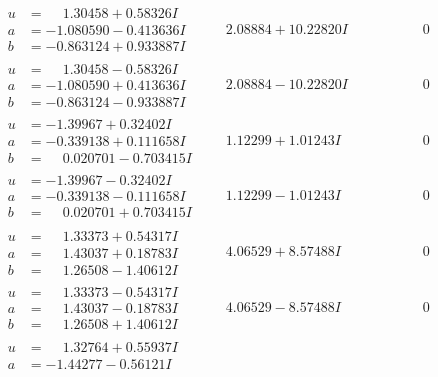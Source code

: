\documentclass[1p]{elsarticle_modified}
\theoremstyle{definition}
\begin{document}
$$\begin{array}{c|c|c}
 \hline 
\begin{aligned}
u &= \phantom{-}1.30458 + 0.58326 I \\
a &= -1.080590 - 0.413636 I \\
b &= -0.863124 + 0.933887 I\end{aligned}
 & \phantom{-}2.08884 + 10.22820 I & \phantom{-0.000000 } 0 \\ \hline\begin{aligned}
u &= \phantom{-}1.30458 - 0.58326 I \\
a &= -1.080590 + 0.413636 I \\
b &= -0.863124 - 0.933887 I\end{aligned}
 & \phantom{-}2.08884 - 10.22820 I & \phantom{-0.000000 } 0 \\ \hline\begin{aligned}
u &= -1.39967 + 0.32402 I \\
a &= -0.339138 + 0.111658 I \\
b &= \phantom{-}0.020701 - 0.703415 I\end{aligned}
 & \phantom{-}1.12299 + 1.01243 I & \phantom{-0.000000 } 0 \\ \hline\begin{aligned}
u &= -1.39967 - 0.32402 I \\
a &= -0.339138 - 0.111658 I \\
b &= \phantom{-}0.020701 + 0.703415 I\end{aligned}
 & \phantom{-}1.12299 - 1.01243 I & \phantom{-0.000000 } 0 \\ \hline\begin{aligned}
u &= \phantom{-}1.33373 + 0.54317 I \\
a &= \phantom{-}1.43037 + 0.18783 I \\
b &= \phantom{-}1.26508 - 1.40612 I\end{aligned}
 & \phantom{-}4.06529 + 8.57488 I & \phantom{-0.000000 } 0 \\ \hline\begin{aligned}
u &= \phantom{-}1.33373 - 0.54317 I \\
a &= \phantom{-}1.43037 - 0.18783 I \\
b &= \phantom{-}1.26508 + 1.40612 I\end{aligned}
 & \phantom{-}4.06529 - 8.57488 I & \phantom{-0.000000 } 0 \\ \hline\begin{aligned}
u &= \phantom{-}1.32764 + 0.55937 I \\
a &= -1.44277 - 0.56121 I \\

\end{aligned}
\end{array}$$
\end{document}
